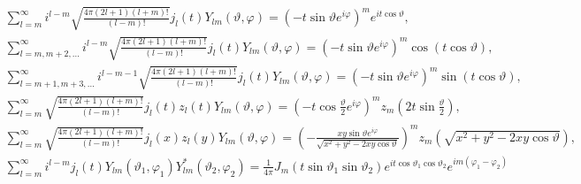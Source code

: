 \begin{gather}
\sum_{l=m}^{\infty} i^{l-m} \sqrt{\frac{4 \pi(2 l+1)(l+m)!}{(l-m)!}} j_{l}(t) Y_{l m}(\vartheta, \varphi)=\left(-t \sin \vartheta e^{i \varphi}\right)^{m} e^{i t \cos \vartheta},  \label{eq:5:10:11}\\
\sum_{l=m, m+2, \ldots}^{\infty} i^{l-m} \sqrt{\frac{4 \pi(2 l+1)(l+m)!}{(l-m)!}} j_{l}(t) Y_{l m}(\vartheta, \varphi)=\left(-t \sin \vartheta e^{i \varphi}\right)^{m} \cos (t \cos \vartheta),  \label{eq:5:10:12}\\
\sum_{l=m+1, m+3, \ldots}^{\infty} i^{l-m-1} \sqrt{\frac{4 \pi(2 l+1)(l+m)!}{(l-m)!}} j_{l}(t) Y_{l m}(\vartheta, \varphi)=\left(-t \sin \vartheta e^{i \varphi}\right)^{m} \sin (t \cos \vartheta),  \label{eq:5:10:13}\\
\sum_{l=m}^{\infty} \sqrt{\frac{4 \pi(2 l+1)(l+m)!}{(l-m)!}} j_{l}(t) z_{l}(t) Y_{l m}(\vartheta, \varphi)=\left(-t \cos \frac{\vartheta}{2} e^{i \varphi}\right)^{m} z_{m}\left(2 t \sin \frac{\vartheta}{2}\right),  \label{eq:5:10:14}\\
\sum_{l=m}^{\infty} \sqrt{\frac{4 \pi(2 l+1)(l+m)!}{(l-m)!}} j_{l}(x) z_{l}(y) Y_{l m}(\vartheta, \varphi)=\left(-\frac{x y \sin \vartheta e^{i \varphi}}{\sqrt{x^{2}+y^{2}-2 x y \cos \vartheta}}\right)^{m} z_{m}\left(\sqrt{x^{2}+y^{2}-2 x y \cos \vartheta}\right),  \label{eq:5:10:15}\\
\sum_{l=m}^{\infty} i^{l-m} j_{l}(t) Y_{l m}\left(\vartheta_{1}, \varphi_{1}\right) Y_{l m}^{*}\left(\vartheta_{2}, \varphi_{2}\right)=\frac{1}{4 \pi} J_{m}\left(t \sin \vartheta_{1} \sin \vartheta_{2}\right) e^{i t \cos \vartheta_{1} \cos \vartheta_{2}} e^{i m\left(\varphi_{1}-\varphi_{2}\right)} \label{eq:5:10:16}
\end{gather}


